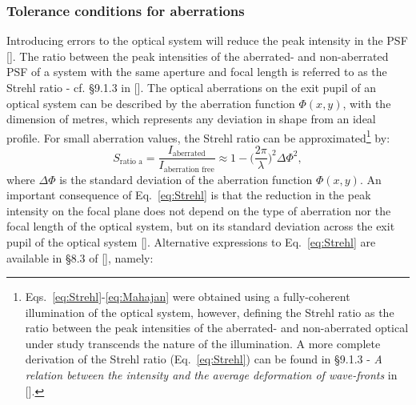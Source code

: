 \begin{refsection}

\subsubsection*{Tolerance conditions for aberrations}

Introducing errors to the optical system will reduce the peak intensity in the PSF [\cite[\textit{\S8.2}]{Mahajan2011}]. The ratio between the peak intensities of the aberrated- and non-aberrated PSF of a system with the same aperture and focal length is referred to as the Strehl ratio - cf. \S9.1.3 in [\cite{born_wolf1999}]. The optical aberrations on the exit pupil of an optical system can be described by the aberration function $\Phi(x,y)$, with the dimension of metres, which represents any deviation in shape from an ideal profile. For small aberration values, the Strehl ratio can be approximated\footnote{Eqs.~\ref{eq:Strehl}-\ref{eq:Mahajan} were obtained using a fully-coherent illumination of the optical system, however, defining the Strehl ratio as the ratio between the peak intensities of the aberrated- and non-aberrated optical under study transcends the nature of the illumination. A more complete derivation of the Strehl ratio (Eq.~\ref{eq:Strehl}) can be found in \S9.1.3 - \textit{A relation between the intensity and the average deformation of wave-fronts} in [\cite{born_wolf1999}].} by:
\begin{equation}\label{eq:Strehl}
    S_{\text{ratio a}}=\frac{I_{\text{aberrated}}}{I_{\text{aberration free}}}\approx1-\bigg(\frac{2\pi}{\lambda}\bigg)^2\Delta\Phi^2,
\end{equation}{}
where $\Delta\Phi$ is the standard deviation of the aberration function $\Phi(x,y)$. An important consequence of Eq.~\ref{eq:Strehl} is that the reduction in the peak intensity on the focal plane does not depend on the type of aberration nor the focal length of the optical system, but on its standard deviation across the exit pupil of the optical system [\cite{born_wolf1999}]. Alternative expressions to Eq.~\ref{eq:Strehl} are available in \S8.3 of [\cite{Mahajan2011}], namely:

\end{refsection}
